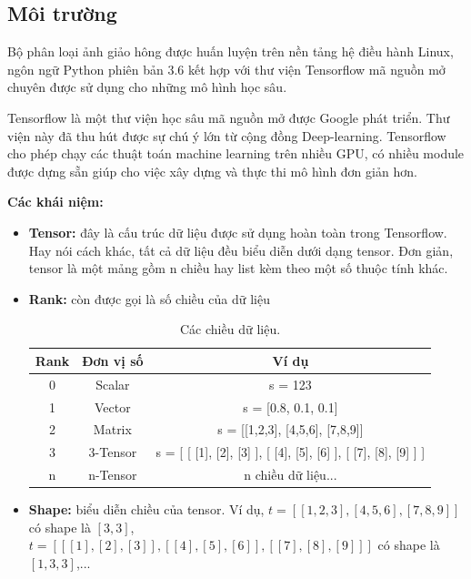\subsection{Môi trường}
	Bộ phân loại ảnh giảo hông được huấn luyện trên nền tảng hệ điều hành Linux, ngôn ngữ Python phiên bản 3.6 kết hợp với thư viện Tensorflow mã nguồn mở chuyên được sử dụng cho những mô hình học sâu.\par
	Tensorflow\cite{tf} là một thư viện học sâu mã nguồn mở được Google phát triển. Thư viện này đã thu hút được sự chú ý lớn từ cộng đồng Deep-learning. Tensorflow cho phép chạy các thuật toán machine learning trên nhiều GPU, có nhiều module được dựng sẵn giúp cho việc xây dựng và thực thi mô hình đơn giản hơn. \par
	\textbf{Các khái niệm:}
	\begin{itemize}
		\item \textbf{Tensor:} đây là cấu trúc dữ liệu được sử dụng hoàn toàn trong Tensorflow. Hay nói cách khác, tất cả dữ liệu đều biểu diễn dưới dạng tensor. Đơn giản, tensor là một mảng gồm n chiều hay list kèm theo một số thuộc tính khác.
		
		\item \textbf{Rank:} còn được gọi là số chiều của dữ liệu
		\begin{table}[h!]
			\centering
			\begin{tabular}{ | c | c | c | }
 			\hline
 			 \textbf{Rank} & \textbf{Đơn vị số} & \textbf{Ví dụ}\\
 			\hline
 			0  & Scalar  & s = 123  \\
			\hline
			1 & Vector & s = [0.8, 0.1, 0.1]	\\
			\hline
			2 & Matrix & s = [[1,2,3], [4,5,6], [7,8,9]]	\\
			\hline
			3 & 3-Tensor & s = [ [ [1], [2], [3] ], [ [4], [5], [6] ], [ [7], [8], [9] ] ]	\\
			\hline
			n & n-Tensor & n chiều dữ liệu... \\
			\hline
			
		\end{tabular}
		\caption{Các chiều dữ liệu.}
		\label{table:rank}
		\end{table}
		
		
		
		
		\item \textbf{Shape:} biểu diễn chiều của tensor. Ví dụ, \(t = [[1,2,3], [4,5,6], [7,8,9]]\) có shape là \([3, 3]\), \(t = [ [ [1], [2], [3] ], [ [4], [5], [6] ], [ [7], [8], [9] ] ]\) có shape là \([1, 3, 3]\),...
		

\end{itemize}
